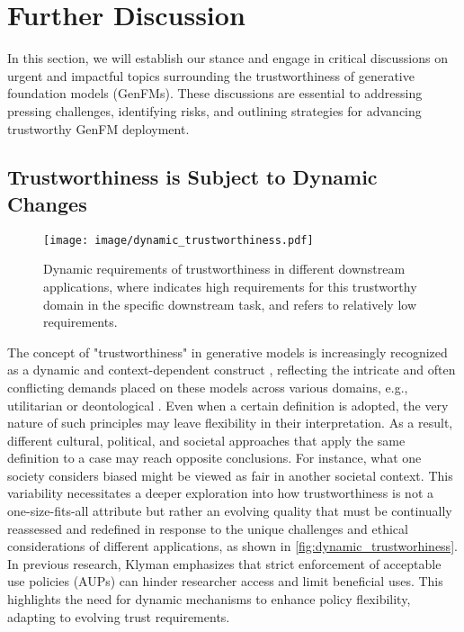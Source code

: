 \clearpage

\section{Further Discussion}
\label{sec:discussion}
In this section, we will establish our stance and engage in critical discussions on urgent and impactful topics surrounding the trustworthiness of generative foundation models (GenFMs). These discussions are essential to addressing pressing challenges, identifying risks, and outlining strategies for advancing trustworthy GenFM deployment.



\subsection{Trustworthiness is Subject to Dynamic Changes}
\label{sec:discuss_dynamic}

\begin{figure}[h]
    \centering\vspace{+0.1in}
    \texttt{[image: image/dynamic\_trustworthiness.pdf]}
    \caption{Dynamic requirements of trustworthiness in different downstream applications, where \CIRCLE indicates high requirements for this trustworthy domain in the specific downstream task, and \LEFTcircle refers to relatively low requirements.} \vspace{+0.15in}
    \label{fig:dynamic_trustworhiness}
\end{figure}

The concept of "trustworthiness" in generative models is increasingly recognized as a dynamic and context-dependent construct \cite{huang2024position, liu2023trustworthy}, reflecting the intricate and often conflicting demands placed on these models across various domains, e.g., utilitarian or deontological \cite{gawronski2017makes, anderson2011machine}. Even when a certain definition is adopted, the very nature of such principles may leave flexibility in their interpretation. As a result, different cultural, political, and societal approaches that apply the same definition to a case may reach opposite conclusions. For instance, what one society considers biased might be viewed as fair in another societal context\cite{henrich2010markets, greene2014moral}. This variability necessitates a deeper exploration into how trustworthiness is not a one-size-fits-all attribute but rather an evolving quality that must be continually reassessed and redefined in response to the unique challenges and ethical considerations of different applications, as shown in \autoref{fig:dynamic_trustworhiness}. In previous research, Klyman \cite{klyman2024acceptable} emphasizes that strict enforcement of acceptable use policies (AUPs) can hinder researcher access and limit beneficial uses. This highlights the need for dynamic mechanisms to enhance policy flexibility, adapting to evolving trust requirements.

